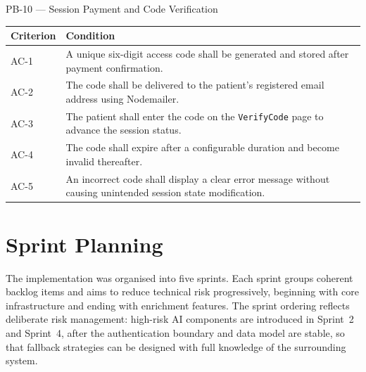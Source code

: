 \documentclass[a4paper,12pt]{report}
\begin{document}
\noindent
\begin{mdframed}[backgroundcolor=lightgray, linecolor=primaryblue, linewidth=1.2pt,
                 innertopmargin=8pt, innerbottommargin=8pt, innerleftmargin=10pt]
PB-10 --- Session Payment and Code Verification
\end{mdframed}

\begin{longtable}{@{} L{2cm} L{12.3cm} @{}}
\toprule
{}
\bfseries Criterion & \bfseries Condition \\
\midrule
AC-1 & A unique six-digit access code shall be generated and stored after payment confirmation. \\
\midrule
AC-2 & The code shall be delivered to the patient's registered email address using Nodemailer. \\
\midrule
AC-3 & The patient shall enter the code on the \texttt{VerifyCode} page to advance the session status. \\
\midrule
AC-4 & The code shall expire after a configurable duration and become invalid thereafter. \\
\midrule
AC-5 & An incorrect code shall display a clear error message without causing unintended session state modification. \\
\bottomrule
\end{longtable}
\clearpage
\section{Sprint Planning}

The implementation was organised into five sprints. Each sprint groups coherent backlog items and aims to reduce technical risk progressively, beginning with core infrastructure and ending with enrichment features. The sprint ordering reflects deliberate risk management: high-risk AI components are introduced in Sprint~2 and Sprint~4, after the authentication boundary and data model are stable, so that fallback strategies can be designed with full knowledge of the surrounding system.
\end{document}
